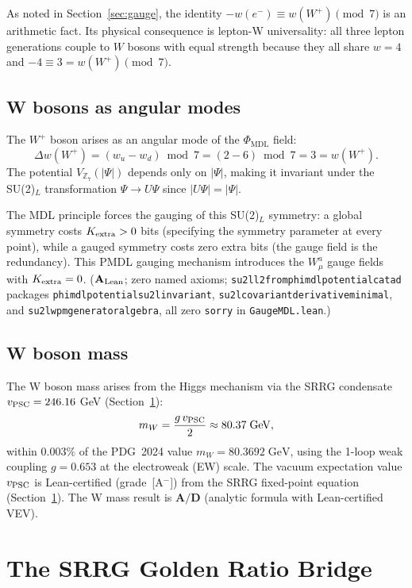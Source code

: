 \documentclass[11pt]{article}
\theoremstyle{remark}
\newcommand{\PHIMDL}{\Phi_{\mathrm{MDL}}}
\newcommand{\ZS}{\mathbb{Z}_7}
\newcommand{\lean}[1]{%
  \penalty-100
  \begingroup\def\_{\textunderscore\allowbreak}\texttt{#1}\endgroup}
\newcommand{\CatAL}{\ensuremath{\textbf{A}_{\rm Lean}}}
\newcommand{\CatAD}{\textbf{A/D}}
\begin{document}
As noted in Section~\ref{sec:gauge}, the identity $-w(e^-) \equiv w(W^+)\pmod 7$
is an arithmetic fact. Its physical consequence is lepton-W universality: all
three lepton generations couple to $W$ bosons with equal strength because they
all share $w=4$ and $-4\equiv 3=w(W^+)\pmod7$.

\subsection{W bosons as angular modes}
\label{ssec:w_angular}

The $W^+$ boson arises as an angular mode of the $\PHIMDL$ field:
\[
  \Delta w(W^+) = (w_u - w_d)\bmod 7 = (2-6)\bmod 7 = 3 = w(W^+).
\]
The potential $V_{\ZS}(|\Psi|)$ depends only on $|\Psi|$, making it invariant
under the SU(2)$_L$ transformation $\Psi\to U\Psi$ since $|U\Psi|=|\Psi|$.

The MDL principle forces the gauging of this SU(2)$_L$ symmetry: a global
symmetry costs $K_{\rm extra}>0$ bits (specifying the symmetry parameter at every
point), while a gauged symmetry costs zero extra bits (the gauge field is the
redundancy). This PMDL gauging mechanism introduces the $W^a_\mu$ gauge fields
with $K_{\rm extra}=0$.
($\CatAL$; zero named axioms; \lean{su2l\_l2\_from\_phimdl\_potential\_catad}
packages \lean{phimdl\_potential\_su2l\_invariant},
\lean{su2l\_covariant\_derivative\_minimal}, and
\lean{su2l\_wpm\_generator\_algebra}, all zero \texttt{sorry} in
\texttt{GaugeMDL.lean}.)

\subsection{W boson mass}
\label{ssec:w_mass}

The W boson mass arises from the Higgs mechanism via the SRRG condensate
$v_{\rm PSC} = 246.16$ GeV (Section~\ref{sec:srrg}):
\[
  m_W = \frac{g\,v_{\rm PSC}}{2} \approx 80.37\;\text{GeV},
\]
within $0.003\%$ of the PDG~2024 value $m_W = 80.3692\;\text{GeV}$,
using the 1-loop weak coupling $g = 0.653$ at the electroweak (EW) scale.
The vacuum expectation value $v_{\rm PSC}$ is Lean-certified (grade~[A$^-$])
from the SRRG fixed-point equation (Section~\ref{sec:srrg}).
The W mass result is $\CatAD$ (analytic formula with Lean-certified VEV).

\section{The SRRG Golden Ratio Bridge}
\label{sec:srrg}
\end{document}

